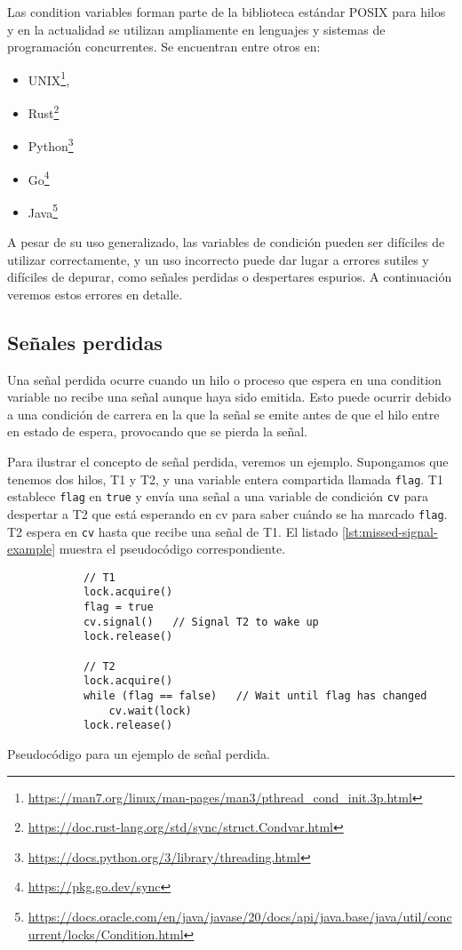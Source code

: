 Las condition variables forman parte de la biblioteca estándar POSIX para hilos \cite{nichols1996pthreads}
y en la actualidad se utilizan ampliamente en lenguajes y sistemas de programación
concurrentes. Se encuentran entre otros en:

\begin{itemize}
      \item UNIX\footnote{\url{https://man7.org/linux/man-pages/man3/pthread_cond_init.3p.html}},
      \item Rust\footnote{\url{https://doc.rust-lang.org/std/sync/struct.Condvar.html}}
      \item Python\footnote{\url{https://docs.python.org/3/library/threading.html}}
      \item Go\footnote{\url{https://pkg.go.dev/sync}}
      \item Java\footnote{
                  \url{https://docs.oracle.com/en/java/javase/20/docs/api/java.base/java/util/concurrent/locks/Condition.html}}
\end{itemize}

A pesar de su uso generalizado, las variables de condición pueden ser difíciles de utilizar
correctamente, y un uso incorrecto puede dar lugar a errores sutiles y difíciles de depurar, como
señales perdidas o despertares espurios. A continuación veremos estos errores en detalle.

\subsection{Señales perdidas}

Una señal perdida ocurre cuando un hilo o proceso que espera en una condition variable no
recibe una señal aunque haya sido emitida. Esto puede ocurrir debido a una condición de
carrera en la que la señal se emite antes de que el hilo entre en estado de espera, provocando
que se pierda la señal.

Para ilustrar el concepto de señal perdida, veremos un ejemplo. Supongamos que tenemos
dos hilos, T1 y T2, y una variable entera compartida llamada \texttt{flag}. T1 establece \texttt{flag} en \texttt{true}
y envía una señal a una variable de condición \texttt{cv} para despertar a T2 que está esperando en
cv para saber cuándo se ha marcado \texttt{flag}. T2 espera en \texttt{cv} hasta que recibe una señal de
T1. El listado \ref{lst:missed-signal-example} muestra el pseudocódigo correspondiente.

\begin{listing}[!htb]
      \begin{verbatim}
            // T1
            lock.acquire()
            flag = true
            cv.signal()   // Signal T2 to wake up
            lock.release()
            
            // T2
            lock.acquire()
            while (flag == false)   // Wait until flag has changed
                cv.wait(lock)
            lock.release()
      \end{verbatim}
      \caption{Pseudocódigo para un ejemplo de señal perdida.}
      \label{lst:missed-signal-example}
\end{listing}

